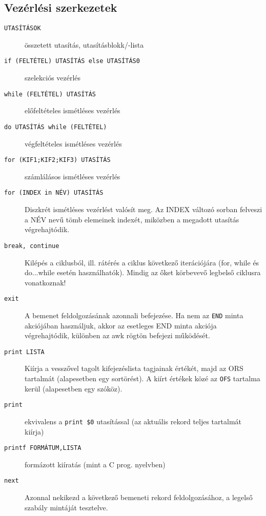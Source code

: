 
\subsection{Vezérlési szerkezetek}
\begin{description}
\item[\tt {UTASÍTÁSOK}] összetett utasítás, utasításblokk/-lista
\item[\tt  if (FELTÉTEL) UTASÍTÁS else UTASÍTÁS0] szelekciós vezérlés
\item[\tt  while (FELTÉTEL) UTASÍTÁS] előfeltételes ismétléses vezérlés
\item[\tt  do UTASÍTÁS while (FELTÉTEL)] végfeltételes ismétléses vezérlés
\item[\tt  for (KIF1;KIF2;KIF3) UTASÍTÁS] számlálásos ismétléses vezérlés
\item[\tt  for (INDEX in NÉV) UTASÍTÁS] Diszkrét ismétléses vezérlést
valósít meg. Az INDEX változó sorban felveszi a NÉV nevű tömb elemeinek indexét, miközben a megadott utasítás végrehajtódik.
\item[\tt  break, continue] Kilépés a ciklusból, ill. rátérés a ciklus következő iterációjára 
(for, while és do...while esetén használhatók). Mindig az őket körbevevő legbelső ciklusra vonatkoznak!
\item[\tt  exit] A bemenet feldolgozásának azonnali befejezése. Ha nem az \texttt{END} minta
akciójában használjuk, akkor az esetleges END minta akciója végrehajtódik, különben az awk rögtön befejezi működését.
\item[\tt  print LISTA] Kiírja a vesszővel tagolt kifejezéslista tagjainak értékét, majd
az ORS tartalmát (alapesetben egy sortörést). A kiírt értékek közé az \verb.OFS. tartalma kerül (alapesetben egy szóköz).
\item[\tt  print] ekvivalens a \verb.print $0. utasítással (az aktuális rekord teljes tartalmát
kiírja)
\item[\tt  printf FORMÁTUM,LISTA] formázott kiíratás (mint a C prog. nyelvben)
\item[\tt  next] Azonnal nekikezd a következő bemeneti rekord feldolgozásához, a legelső szabály mintáját tesztelve.
\end{description}


